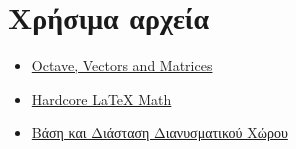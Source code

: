 \documentclass[12pt, fleqn, leqno]{extreport}
\begin{document}
\section{Χρήσιμα αρχεία}
\begin{itemize}
    \item \href{http://www.yanivplan.com/files/tutorial2vectors.pdf}{Octave, Vectors and Matrices}
    \item \href{http://web.mit.edu/rsi/www/pdfs/advmath.pdf}{Hardcore LaTeX Math}
    \item \href{http://www.katsetis.gr/mathimataeapsimeioseis/plh12/PLI12bash_kai_diastash_dianysmatikoy_xwroy.pdf}{Βάση και Διάσταση Διανυσματικού Χώρου}
\end{itemize}
\end{document}
